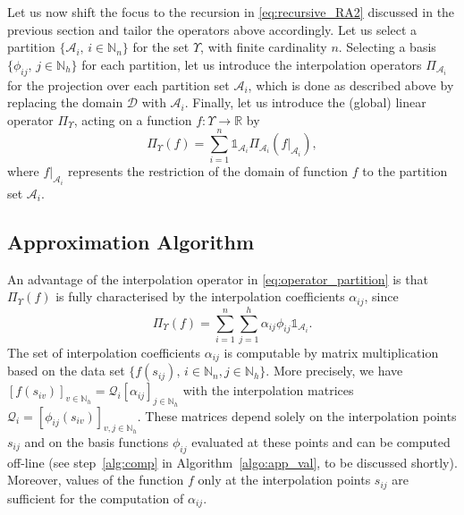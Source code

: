 \documentclass{LMCS}
\begin{document}
Let us now shift the focus to the recursion in \eqref{eq:recursive_RA2} discussed in the previous section and tailor the operators above accordingly. 
Let us select a partition $\{\mathcal A_i,\,i\in\mathbb N_n\}$ for the set $\Upsilon$, 
with finite cardinality $n$. 
Selecting a basis $\{\phi_{ij},\,j\in\mathbb N_h\}$ for each partition, 
let us introduce the interpolation operators $\Pi_{\mathcal A_i}$ 
for the projection over each partition set $\mathcal A_i$,  
which is done as described above by replacing the domain $\mathcal D$ with $\mathcal A_i$. 
Finally, let us introduce the (global) linear operator $\Pi_{\Upsilon}$, 
acting on a function $f:\Upsilon\rightarrow \mathbb{R}$ by 
\begin{equation}
\label{eq:operator_partition}
\Pi_{\Upsilon}(f) = \sum_{i=1}^n \mathds{1}_{\mathcal A_i}\Pi_{\mathcal A_i}(f|_{\mathcal A_i}), 
\end{equation}
where $f|_{\mathcal A_i}$ represents the restriction of the domain of function $f$ to the partition set $\mathcal A_i$.

\subsection{Approximation Algorithm}
An advantage of the interpolation operator in \eqref{eq:operator_partition} is that $\Pi_{\Upsilon}(f)$ 
is fully characterised by the interpolation coefficients $\alpha_{ij}$, since 
\begin{equation*}
\Pi_{\Upsilon}(f) = \sum_{i=1}^{n}\sum_{j=1}^{h}\alpha_{ij}\phi_{ij}\mathds{1}_{\mathcal A_i}.
\end{equation*} 
The set of interpolation coefficients $\alpha_{ij}$ is computable by matrix multiplication 
based on the data set $\{f(s_{ij}),\,i\in\mathbb N_n,j\in\mathbb N_h\}$.
More precisely, we have $[f(s_{iv})]_{v\in\mathbb N_h} = \mathcal Q_i [\alpha_{ij}]_{j\in\mathbb N_h}$ with the interpolation matrices $\mathcal Q_i = [\phi_{ij}(s_{iv})]_{v,j\in\mathbb N_h}$.
These matrices depend solely on the interpolation points $s_{ij}$ and on the basis functions $\phi_{ij}$ evaluated at these points 
and can be computed off-line (see step~\ref{alg:comp} in Algorithm~\ref{algo:app_val}, to be discussed shortly).
Moreover, values of the function $f$ only at the interpolation points $s_{ij}$ are sufficient for the computation of $\alpha_{ij}$. 
\end{document}
